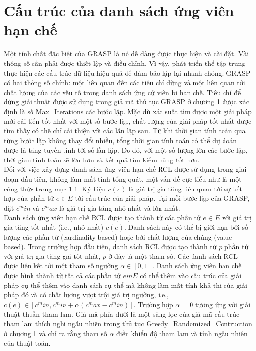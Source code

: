 \documentclass[14pt,a4paper]{report}
\begin{document}
\section{Cấu trúc của danh sách ứng viên hạn chế}
Một tính chất đặc biệt của GRASP là nó dễ dàng được thực hiện và cài đặt. Vài thông số cần phải được thiết lập và điều chỉnh. Vì vậy, phát triển thể
tập trung thực hiện các cấu trúc dữ liệu hiệu quả để đảm bảo lặp lại nhanh chóng. GRASP có hai thông số chính: một liên quan đến các tiêu chí dừng và một liên quan tới chất lượng của các yếu tố trong danh sách ứng cử viên bị hạn chế. Tiêu chí để dừng giải thuật được sử dụng trong giả mã thủ tục GRASP ở chương 1 được xác định là số Max\_Iterations các bước lặp. Mặc dù xác suất tìm được một giải pháp mới cải tiến tốt nhất với một số bước lặp, chất lượng của giải pháp tốt nhất được tìm thấy có thể chỉ cải thiện với các lần lặp sau. Từ khi thời gian tính toán qua từng bước lặp không thay đổi nhiều, tổng thời gian tính toán có thể dự doán được là tăng tuyến tính tới số lần lặp. Do đó, với một số lượng lớn các bước lặp, thời gian tính toán sẽ lớn hơn và kết quả tìm kiếm cũng tốt hơn.\\
Đối với việc xây dựng danh sách ứng viên hạn chế RCL được sử dụng trong giai đoạn đầu tiên, không làm mất tính tổng quát, một vấn đề cực tiểu như là một công thức trong mục 1.1. Ký hiệu $c(e)$ là giá trị gia tăng liên quan tới sự kết hợp của phần tử $e \in E$ tới cấu trúc của giải pháp. Tại mỗi bước lặp của GRASP, đặt
$c^min$ và $c^max$ là giá trị gia tăng nhỏ nhất và lớn nhất.\\

Danh sách ứng viên hạn chế RCL được tạo thành từ các phần tử $e \in E$ với giá trị gia tăng tốt nhất (i.e., nhỏ nhất) $c(e)$. Danh sách này có thể bị giới hạn bởi số lượng các phần tử (cardinality-based) hoặc bởi chất lượng của chúng (value-based). Trong trường hợp đầu tiên, danh sách RCL được tạo thành từ $p$ phần tử với giá trị gia tăng giá tốt nhất, $p$ ở đây là một tham số. Các danh sách RCL được liên kết tới một tham số ngưỡng $\alpha \in [0, 1]$. Danh sách ứng viên hạn chế được hình thành từ tất cả các phần tử $e in E$ có thể thêm vào cấu trúc của giải pháp cụ thể thêm vào danh sách cụ thể mà không làm mất tính khả thi của giải pháp đó và có chất lượng vượt trội giá trị ngưỡng, i.e., $c(e) \in [c^min, c^min + \alpha (c^max - c^min)]$. Trường hợp $\alpha$ = 0 tương ứng với giải thuật thuần tham lam. Giả mã phía dưới là một sàng lọc của giả mã cấu trúc tham lam thích nghi ngẫu nhiên trong thủ tục Greedy\_Randomized\_Contruction ở chương 1 và chỉ ra rằng tham số $\alpha$ điều khiển độ tham lam và tính ngẫu nhiên của thuật toán.\\
\end{document}
